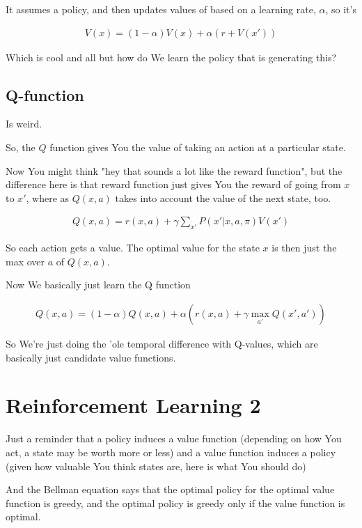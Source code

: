 \documentclass{article}
\begin{document}
		It assumes a policy, and then updates values of based on a learning rate, $\alpha$, so it's 
		
		\begin{align}
			V(x) = (1-\alpha) V(x) + \alpha (r + V(x'))
		\end{align}
		
		Which is cool and all but how do We learn the policy that is generating this?
		
	\subsection{Q-function}
	
		Is weird. 
		
		So, the $Q$ function gives You the value of taking an action at a particular state.
		
		Now You might think "hey that sounds a lot like the reward function", but the difference here is that reward function just gives You the reward of going from $x$ to $x'$, where as $Q(x, a)$ takes into account the value of the next state, too.
		
		\begin{align}
			Q(x, a) = r(x, a) + \gamma \sum_{x'} P(x'|x, a, \pi) V(x')
		\end{align}
		
		So each action gets a value. The optimal value for the state $x$ is then just the max over $a$ of $Q(x, a)$.
		
		Now We basically just learn the Q function
		
		\begin{align}
			Q(x, a) = (1-\alpha)Q(x, a) + \alpha(r(x, a) + \gamma \max_{a'}Q(x', a'))
		\end{align}
		
		So We're just doing the 'ole temporal difference with Q-values, which are basically just candidate value functions.


\newpage		
\section{Reinforcement Learning 2}

	Just a reminder that a policy induces a value function (depending on how You act, a state may be worth more or less) and a value function induces a policy (given how valuable You think states are, here is what You should do)
	
	And the Bellman equation says that the optimal policy for the optimal value function is greedy, and the optimal policy is greedy only if the value function is optimal.
	
\end{document}
